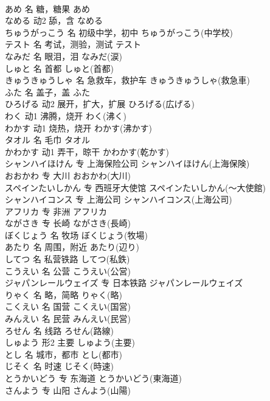 \documentclass[8pt]{extreport}
\begin{document}
\begin{CJK}{UTF8}{min}
\\	あめ	名	糖，糖果	あめ	
\\	なめる	动2	舔，含	なめる	
\\	ちゅうがっこう	名	初级中学，初中	ちゅうがっこう(中学校)	
\\	テスト	名	考试，测验，测试	テスト	
\\	なみだ	名	眼泪，泪	なみだ(涙)	
\\	しゅと	名	首都	しゅと(首都)	
\\	きゅうきゅうしゃ	名	急救车，救护车	きゅうきゅうしゃ(救急車)	
\\	ふた	名	盖子，盖	ふた	
\\	ひろげる	动2	展开，扩大，扩展	ひろげる(広げる)	
\\	わく	动1	沸腾，烧开	わく(沸く)	
\\	わかす	动1	烧热，烧开	わかす(沸かす)	
\\	タオル	名	毛巾	タオル	
\\	かわかす	动1	弄干，晾干	かわかす(乾かす)	
\\	シャンハイほけん	专	上海保险公司	シャンハイほけん(上海保険)	
\\	おおかわ	专	大川	おおかわ(大川)	
\\	スペインたいしかん	专	西班牙大使馆	スペインたいしかん(～大使館)	
\\	シャンハイコンス	专	上海公司	シャンハイコンス(上海公司)	
\\	アフリカ	专	非洲	アフリカ	
\\	ながさき	专	长崎	ながさき(長崎)	
\\	ぼくじょう	名	牧场	ぼくじょう(牧場)	
\\	あたり	名	周围，附近	あたり(辺り)	
\\	してつ	名	私营铁路	してつ(私鉄)	
\\	こうえい	名	公营	こうえい(公営)	
\\	ジャパンレールウェイズ	专	日本铁路	ジャパンレールウェイズ
\\	りゃく	名	略，简略	りゃく(略)	
\\	こくえい	名	国营	こくえい(国営)	
\\	みんえい	名	民营	みんえい(民営)	
\\	ろせん	名	线路	ろせん(路線)	
\\	しゅよう	形2	主要	しゅよう(主要)	
\\	とし	名	城市，都市	とし(都市)	
\\	じそく	名	时速	じそく(時速)	
\\	とうかいどう	专	东海道	とうかいどう(東海道)	
\\	さんよう	专	山阳	さんよう(山陽)	

\end{CJK}
\end{document}
